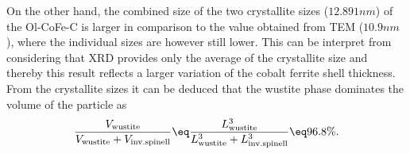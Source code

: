 \documentclass[\main/dresen_thesis.tex]{subfiles}
\begin{document}
    On the other hand, the combined size of the two crystallite sizes ($12.891 \unit{nm}$) of the Ol-CoFe-C is larger in comparison to the value obtained from TEM ($10.9 \unit{nm}$), where the individual sizes are however still lower.
    This can be interpret from considering that XRD provides only the average of the crystallite size and thereby this result reflects a larger variation of the cobalt ferrite shell thickness.
    From the crystallite sizes it can be deduced that the wustite phase dominates the volume of the particle as
    \begin{align}
      \frac{V_{\mathrm{wustite}}}{V_{\mathrm{wustite}} + V_{\mathrm{inv. spinell}}} \eq \frac{L^3_{\mathrm{wustite}}}{ L^3_{\mathrm{wustite}} + L^3_{\mathrm{inv. spinell}}} \eq 96.8 \%.
    \end{align}
\end{document}
